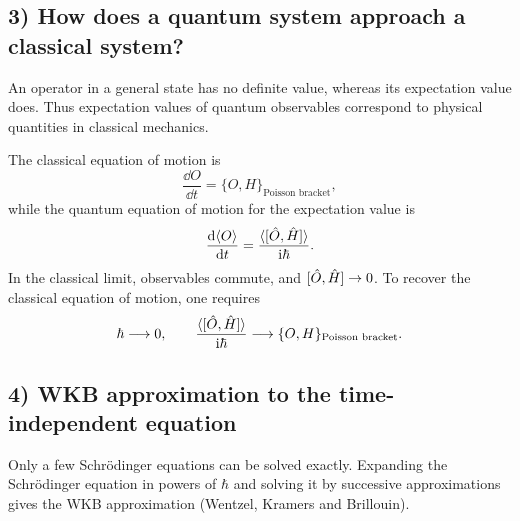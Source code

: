 \subsection*{3) How does a quantum system approach a classical system?}
An operator in a general state has no definite value, whereas its expectation value does. Thus expectation values of quantum observables correspond to physical quantities in classical mechanics.

The classical equation of motion is
\begin{equation}
\frac{\dd O}{\dd t}=\{O,H\}_{\text{Poisson bracket}},
\end{equation}
while the quantum equation of motion for the expectation value is
\begin{equation}
\frac{\mathrm{d}\langle O\rangle}{\mathrm{d} t}
=\frac{\langle[\hat{O},\hat{H}]\rangle}{\mathrm{i}\hbar}.
\end{equation}
In the classical limit, observables commute, and $[\hat{O},\hat{H}]\to0$. To recover the classical equation of motion, one requires
\begin{equation}
\hbar\longrightarrow0,\qquad
\frac{\langle[\hat{O},\hat{H}]\rangle}{\mathrm{i}\hbar}
\longrightarrow\{O,H\}_{\text{Poisson bracket}}.
\end{equation}

\subsection*{4) WKB approximation to the time-independent equation}
Only a few Schr\"odinger equations can be solved exactly. Expanding the Schr\"odinger equation in powers of $\hbar$ and solving it by successive approximations gives the WKB approximation (Wentzel, Kramers and Brillouin).

